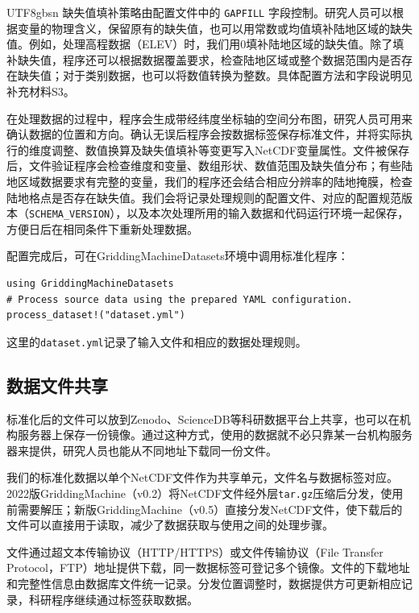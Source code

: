 \documentclass[numdoi]{chinese}
\begin{document}
\begin{CJK}{UTF8}{gbsn}
缺失值填补策略由配置文件中的 \nolinkurl{GAPFILL} 字段控制。研究人员可以根据变量的物理含义，保留原有的缺失值，也可以用常数或均值填补陆地区域的缺失值。例如，处理高程数据（ELEV）时，我们用0填补陆地区域的缺失值。除了填补缺失值，程序还可以根据数据覆盖要求，检查陆地区域或整个数据范围内是否存在缺失值；对于类别数据，也可以将数值转换为整数。具体配置方法和字段说明见补充材料S3。

在处理数据的过程中，程序会生成带经纬度坐标轴的空间分布图，研究人员可用来确认数据的位置和方向。确认无误后程序会按数据标签保存标准文件，并将实际执行的维度调整、\allowbreak{}数值换算及缺失值填补等变更写入NetCDF变量属性。文件被保存后，文件验证程序会检查维度和变量、\allowbreak{}数组形状、\allowbreak{}数值范围及缺失值分布；有些陆地区域数据要求有完整的变量，我们的程序还会结合相应分辨率的陆地掩膜，检查陆地格点是否存在缺失值。我们会将记录处理规则的配置文件、\allowbreak{}对应的配置规范版本（\nolinkurl{SCHEMA_VERSION}），以及本次处理所用的输入数据和代码运行环境一起保存，方便日后在相同条件下重新处理数据。

配置完成后，可在GriddingMachineDatasets环境中调用标准化程序：

\begingroup\singlespacing
\begin{Verbatim}[fontsize=\small,frame=single,framesep=5pt]
using GriddingMachineDatasets
# Process source data using the prepared YAML configuration.
process_dataset!("dataset.yml")
\end{Verbatim}
\endgroup

这里的\nolinkurl{dataset.yml}记录了输入文件和相应的数据处理规则。

\subsection{数据文件共享}

标准化后的文件可以放到Zenodo、\allowbreak{}ScienceDB等科研数据平台上共享，也可以在机构服务器上保存一份镜像。通过这种方式，使用的数据就不必只靠某一台机构服务器来提供，研究人员也能从不同地址下载同一份文件。

我们的标准化数据以单个NetCDF文件作为共享单元，文件名与数据标签对应。2022版GriddingMachine（v0.2）将NetCDF文件经外层\nolinkurl{tar.gz}压缩后分发，使用前需要解压；新版GriddingMachine（v0.5）直接分发NetCDF文件，使下载后的文件可以直接用于读取，减少了数据获取与使用之间的处理步骤。

文件通过超文本传输协议（HTTP/HTTPS）或文件传输协议（File Transfer Protocol，FTP）地址提供下载，同一数据标签可登记多个镜像。文件的下载地址和完整性信息由数据库文件统一记录。分发位置调整时，数据提供方可更新相应记录，科研程序继续通过标签获取数据。


\end{CJK}
\end{document}

